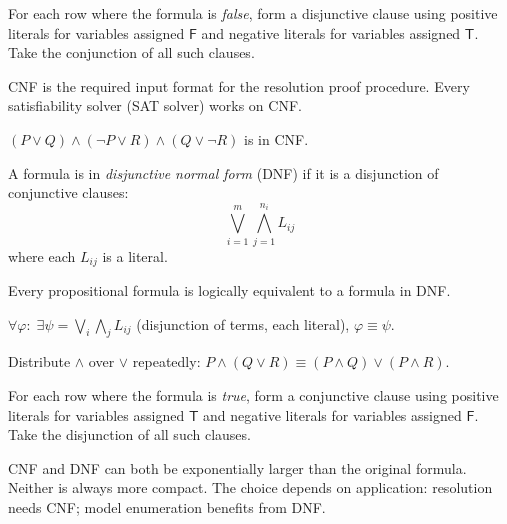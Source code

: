 \begin{remark}
For each row where the formula is \emph{false}, form a disjunctive clause
using positive literals for variables assigned $\mathsf{F}$ and negative literals
for variables assigned $\mathsf{T}$. Take the conjunction of all such clauses.
\end{remark}

\begin{remark}
CNF is the required input format for the resolution proof procedure.
Every satisfiability solver (SAT solver) works on CNF.
\end{remark}

\begin{example}
$(P \vee Q) \wedge (\neg P \vee R) \wedge (Q \vee \neg R)$ is in CNF.
\end{example}

\begin{tcolorbox}[colback=propbox, colframe=propborder, arc=2pt,
  left=6pt, right=6pt, top=4pt, bottom=4pt,
  title={\small\textbf{Definition (Disjunctive Normal Form — DNF)}},
  fonttitle=\small\bfseries]
\label{def:dnf}
A formula is in \emph{disjunctive normal form} (DNF) if it is a disjunction of
conjunctive clauses:
\[
\bigvee_{i=1}^{m} \bigwedge_{j=1}^{n_i} L_{ij}
\]
where each $L_{ij}$ is a literal.
\end{tcolorbox}

\begin{proposition}
\label{prop:dnf-exists}
Every propositional formula is logically equivalent to a formula in DNF.
\end{proposition}

\begin{remark*}
$\forall\varphi:\; \exists\psi = \bigvee_i \bigwedge_j L_{ij}$ (disjunction of terms, each literal),\; $\varphi \equiv \psi$.
\end{remark*}


\begin{remark}
Distribute $\wedge$ over $\vee$ repeatedly:
$P \wedge (Q \vee R) \equiv (P \wedge Q) \vee (P \wedge R)$.
\end{remark}

\begin{remark}
For each row where the formula is \emph{true}, form a conjunctive clause
using positive literals for variables assigned $\mathsf{T}$ and negative literals
for variables assigned $\mathsf{F}$. Take the disjunction of all such clauses.
\end{remark}

\begin{remark}
CNF and DNF can both be exponentially larger than the original formula.
Neither is always more compact. The choice depends on application:
resolution needs CNF; model enumeration benefits from DNF.
\end{remark}
